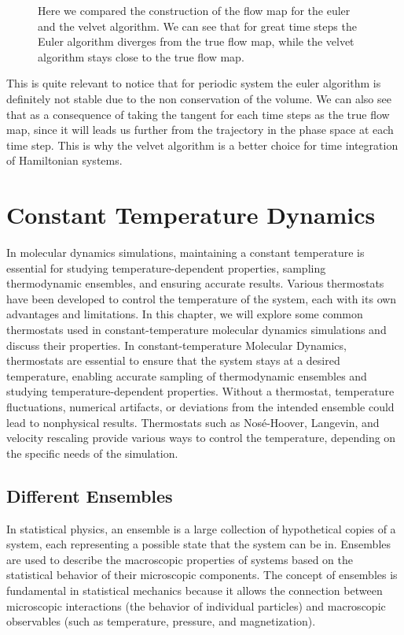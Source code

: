 \documentclass[ansiapaper]{report}
\begin{document}
\begin{multicols}{3}
\begin{figure}[H]
		\caption{\label{fig:Velevet_Construction} Here we compared the construction of the flow map for the euler and the velvet algorithm. We can see that for great time steps the Euler algorithm diverges from the true flow map, while the velvet algorithm stays close to the true flow map.}
	\end{figure}
	This is quite relevant to notice that for periodic system the euler algorithm is definitely not stable due to the non conservation of the volume. We can also see that as a consequence of taking the tangent for each time steps as the true flow map, since it will leads us further from the trajectory in the phase space at each time step. This is why the velvet algorithm is a better choice for time integration of Hamiltonian systems.

	\chapter{Constant Temperature Dynamics}
	
    In molecular dynamics simulations, maintaining a constant temperature is essential for studying temperature-dependent properties, sampling thermodynamic ensembles, and ensuring accurate results. Various thermostats have been developed to control the temperature of the system, each with its own advantages and limitations. In this chapter, we will explore some common thermostats used in constant-temperature molecular dynamics simulations and discuss their properties.
	In constant-temperature Molecular Dynamics, thermostats are essential to ensure that the system stays at a desired temperature, enabling accurate sampling of thermodynamic ensembles and studying temperature-dependent properties. Without a thermostat, temperature fluctuations, numerical artifacts, or deviations from the intended ensemble could lead to nonphysical results. Thermostats such as Nosé-Hoover, Langevin, and velocity rescaling provide various ways to control the temperature, depending on the specific needs of the simulation.
    \section{Different Ensembles}

	In statistical physics, an ensemble is a large collection of hypothetical copies of a system, each representing a possible state that the system can be in. Ensembles are used to describe the macroscopic properties of systems based on the statistical behavior of their microscopic components. The concept of ensembles is fundamental in statistical mechanics because it allows the connection between microscopic interactions (the behavior of individual particles) and macroscopic observables (such as temperature, pressure, and magnetization).


\end{multicols}
\end{document}
